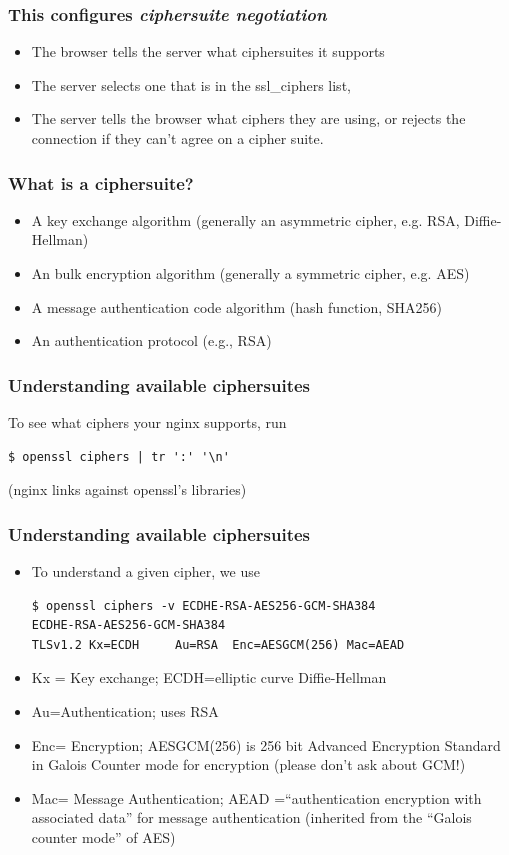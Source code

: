 \documentclass[9pt]{beamer}
\begin{document}
\begin{frame}[fragile]
\frametitle{This configures \emph{ciphersuite negotiation}}
\begin{itemize}
\item The browser tells the server what ciphersuites it supports
\pause
\item The server selects one that is in the ssl\_ciphers list,
\pause
\item The server tells the browser what ciphers they are using, or rejects the connection if they can't agree on a cipher suite.
\end{itemize}
\end{frame}

\begin{frame}[fragile]
\frametitle{What is a ciphersuite?}
\pause
\begin{itemize}
\item A key exchange algorithm (generally an asymmetric cipher, e.g. RSA, Diffie-Hellman)
\pause
\item An bulk encryption algorithm (generally a symmetric cipher, e.g. AES)
\pause
\item A message authentication code algorithm  (hash function, SHA256)
\pause
\item An authentication protocol (e.g., RSA)
\end{itemize}
\end{frame}

\begin{frame}[fragile]
\frametitle{Understanding available ciphersuites}
To see what ciphers your nginx supports, run
\begin{verbatim}
$ openssl ciphers | tr ':' '\n'
\end{verbatim}
(nginx links against openssl's libraries)
\end{frame}

\begin{frame}[fragile]
\frametitle{Understanding available ciphersuites}
\begin{itemize}
\item To understand a given cipher, we use
\begin{verbatim}
$ openssl ciphers -v ECDHE-RSA-AES256-GCM-SHA384
ECDHE-RSA-AES256-GCM-SHA384
TLSv1.2 Kx=ECDH     Au=RSA  Enc=AESGCM(256) Mac=AEAD
\end{verbatim}
\pause
\item Kx = Key exchange; ECDH=elliptic curve Diffie-Hellman
\pause
\item Au=Authentication; uses RSA 
\pause
\item  Enc= Encryption; AESGCM(256) is 256 bit Advanced Encryption Standard in Galois Counter mode for encryption (please don't ask about GCM!)
\pause
\item Mac= Message Authentication; AEAD =``authentication encryption with associated data'' for message authentication (inherited from the ``Galois counter mode'' of AES)
\end{itemize}
\end{frame}
\end{document}
